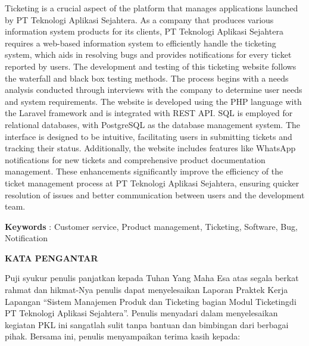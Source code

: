 \documentclass[12pt]{article}
\begin{document}
\noindent Ticketing is a crucial aspect of the platform that manages applications launched by PT Teknologi Aplikasi Sejahtera. As a company that produces various information system products for its clients, PT Teknologi Aplikasi Sejahtera requires a web-based information system to efficiently handle the ticketing system, which aids in resolving bugs and provides notifications for every ticket reported by users. The development and testing of this ticketing website follows the waterfall and black box testing methods. The process begins with a needs analysis conducted through interviews with the company to determine user needs and system requirements. The website is developed using the PHP language with the Laravel framework and is integrated with REST API. SQL is employed for relational databases, with PostgreSQL as the database management system. The interface is designed to be intuitive, facilitating users in submitting tickets and tracking their status. Additionally, the website includes features like WhatsApp notifications for new tickets and comprehensive product documentation management. These enhancements significantly improve the efficiency of the ticket management process at PT Teknologi Aplikasi Sejahtera, ensuring quicker resolution of issues and better communication between users and the development team.

\vspace*{1cm}
\noindent \textbf{Keywords} : Customer service, Product management, Ticketing, Software, Bug, Notification


\newpage

\begin{center}
    \textbf{\large KATA PENGANTAR} \\
\end{center}

Puji syukur penulis panjatkan kepada Tuhan Yang Maha Esa atas segala berkat rahmat dan hikmat-Nya penulis dapat menyelesaikan Laporan Praktek Kerja Lapangan “Sistem Manajemen Produk dan Ticketing bagian Modul Ticketingdi PT Teknologi Aplikasi Sejahtera”. Penulis menyadari dalam menyelesaikan kegiatan PKL ini sangatlah sulit tanpa bantuan dan bimbingan dari berbagai  pihak. Bersama ini, penulis menyampaikan terima kasih kepada:
\end{document}
